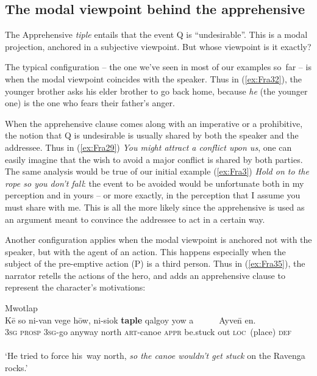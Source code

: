 \documentclass[output=paper,colorlinks,citecolor=brown]{langscibook}
\begin{document}
\subsection{The modal viewpoint behind the apprehensive}
\label{subsec:modalviewpoint}
 
The Apprehensive \textit{tiple} entails that the event Q is ``undesirable''. This is a modal projection, anchored in a subjective viewpoint. But whose viewpoint is it \mbox{exactly}?

The typical configuration -- the one we've seen in most of our examples so~far -- is when the modal viewpoint coincides with the speaker. Thus in (\ref{ex:Fra32}), the younger brother asks his elder brother to go back home, because \textit{he} (the younger one) is the one who fears their father's anger.

When the apprehensive clause comes along with an imperative or a prohibitive, the notion that Q is undesirable is usually shared by both the speaker and the addressee. Thus in (\ref{ex:Fra29}) \textit{You might attract a conflict upon us}, one can easily imagine that the wish to avoid a major conflict is shared by both parties. The same analysis would be true of our initial example (\ref{ex:Fra3}) \textit{Hold on to the rope so you don't fall}: the event to be avoided would be unfortunate both in my perception and in yours -- or more exactly, in the perception that I assume you must share with me. This is all the more likely since the apprehensive is used as an argument meant to convince the addressee to act in a certain way.

Another configuration applies when the modal viewpoint is anchored not with the speaker, but with the agent of an action. This happens especially when the subject of the pre-emptive action (P) is a third person. Thus in (\ref{ex:Fra35}), the narrator retells the actions of the hero, and adds an apprehensive clause to represent the character's motivations:

\ea \label{ex:Fra35} \textnormal{Mwotlap}  \\
\gll Kē so ni-van vege hōw, ni-siok \textbf{taple} qalgoy yow a~~~~~~Ayve\={n} en. \\
\textsc{3sg} \textsc{prosp} \textsc{3sg}-go anyway north \textsc{art}-canoe \textsc{appr} be.stuck out \textsc{loc}~(place) \textsc{def} \\
  \\
`He tried to force his~way north, \textit{so the canoe wouldn't get stuck} on the Ravenga rocks.' 
\z
\end{document}
